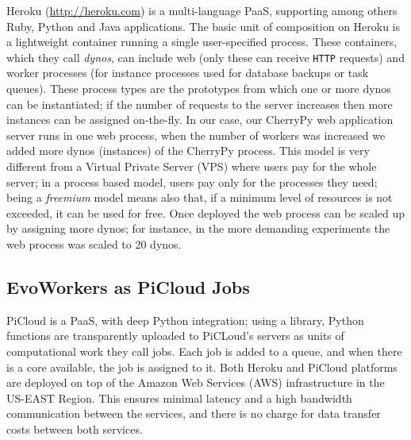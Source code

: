 Heroku (\url{http://heroku.com}) is a multi-language PaaS, supporting among others Ruby, Python and Java applications. The basic unit of composition on
Heroku is a lightweight container running a single user-specified
process. These containers, which they call {\em dynos}, can include web
(only these can receive {\tt HTTP} requests) and worker processes
(for instance processes used for database backups or task queues).
These  process types are the prototypes from which one or more dynos 
can be instantiated; if the number of requests to the server increases then 
more instances can be assigned on-the-fly. In our case, our CherryPy 
web application server runs in one web process, when the number 
of workers was increased we added more dynos (instances) of the 
CherryPy process. This model is very different from a Virtual Private Server (VPS) where users pay for the whole server; in a process based model, users pay only for the processes they need; being a {\em freemium} model means also that, if a minimum level of resources is not exceeded, it can be used for
free. 
Once deployed the web process can be scaled up by assigning more dynos;
for instance, in the more demanding experiments the web process was scaled to 20 dynos.


\subsection{EvoWorkers as PiCloud Jobs}
PiCloud is a PaaS, with deep Python integration; 
using a library, Python functions are transparently uploaded to PiCLoud's 
servers as units of computational work they call jobs. 
Each job is added to a queue, and when there is a core available, 
the job is assigned to it. Both Heroku and PiCloud 
platforms are deployed on top of the Amazon Web Services (AWS) 
infrastructure in the US-EAST Region. This ensures minimal 
latency and a high bandwidth communication between the services, 
and there is no charge for data transfer costs between both services.



